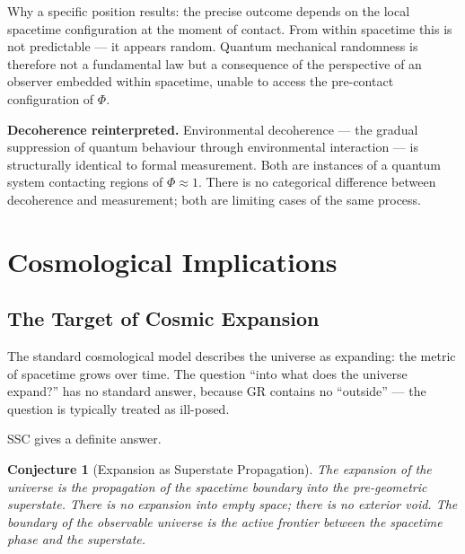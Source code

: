 \documentclass[12pt,a4paper]{article}
\newtheorem{conjecture}{Conjecture}
\begin{document}
\noindent
Why a specific position results: the precise outcome depends on the
local spacetime configuration at the moment of contact.  From within
spacetime this is not predictable — it appears random.  Quantum
mechanical randomness is therefore not a fundamental law but a
consequence of the perspective of an observer embedded within spacetime,
unable to access the pre-contact configuration of $\Phi$.

\noindent
\textbf{Decoherence reinterpreted.}  Environmental decoherence — the
gradual suppression of quantum behaviour through environmental
interaction — is structurally identical to formal measurement.  Both
are instances of a quantum system contacting regions of $\Phi \approx 1$.
There is no categorical difference between decoherence and measurement;
both are limiting cases of the same process.

\section{Cosmological Implications}
\label{sec:cosmo}

\subsection{The Target of Cosmic Expansion}
\label{sec:expansion}

The standard cosmological model describes the universe as expanding:
the metric of spacetime grows over time.  The question ``into what does
the universe expand?'' has no standard answer, because GR contains no
``outside'' — the question is typically treated as ill-posed.

SSC gives a definite answer.

\begin{conjecture}[Expansion as Superstate Propagation]
\label{conj:expansion}
The expansion of the universe is the propagation of the spacetime
boundary into the pre-geometric superstate.  There is no expansion
into empty space; there is no exterior void.  The boundary of the
observable universe is the active frontier between the spacetime phase
and the superstate.
\end{conjecture}
\end{document}
